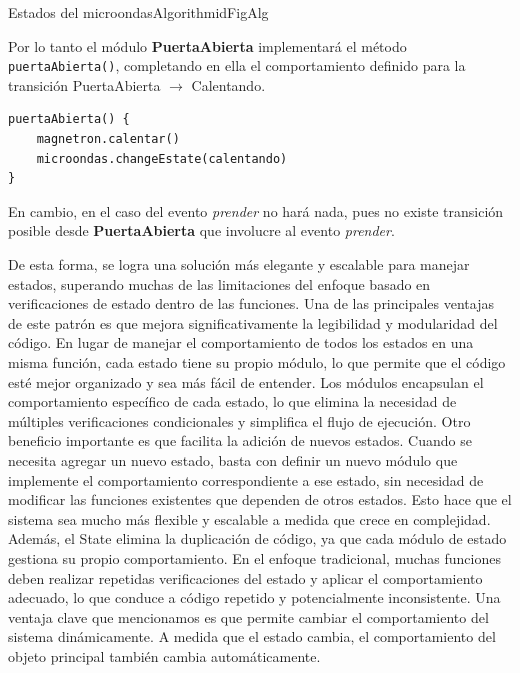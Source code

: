 \begin{pattern}[]{Estados del microondas}{Algorithm}{idFigAlg}
\assigns
{}

\end{pattern}

Por lo tanto el módulo \textbf{PuertaAbierta} implementará el método \verb|puertaAbierta()|, completando en ella el comportamiento definido para la transición PuertaAbierta $\xrightarrow{}$ Calentando.

\begin{lstlisting}[caption=Implementación  puertaAbierta, style=seudocode]
puertaAbierta() {
    magnetron.calentar()
    microondas.changeEstate(calentando)
}
\end{lstlisting}

En cambio, en el caso del evento \textit{prender} no hará nada, pues no existe transición posible desde \textbf{PuertaAbierta} que involucre al evento \textit{prender}.

De esta forma, se logra una solución más elegante y escalable para manejar estados, superando muchas de las limitaciones del enfoque basado en verificaciones de estado dentro de las funciones. Una de las principales ventajas de este patrón es que mejora significativamente la legibilidad y modularidad del código. En lugar de manejar el comportamiento de todos los estados en una misma función, cada estado tiene su propio módulo, lo que permite que el código esté mejor organizado y sea más fácil de entender. Los módulos encapsulan el comportamiento específico de cada estado, lo que elimina la necesidad de múltiples verificaciones condicionales y simplifica el flujo de ejecución. Otro beneficio importante es que facilita la adición de nuevos estados. Cuando se necesita agregar un nuevo estado, basta con definir un nuevo módulo que implemente el comportamiento correspondiente a ese estado, sin necesidad de modificar las funciones existentes que dependen de otros estados. Esto hace que el sistema sea mucho más flexible y escalable a medida que crece en complejidad. Además, el State elimina la duplicación de código, ya que cada módulo de estado gestiona su propio comportamiento. En el enfoque tradicional, muchas funciones deben realizar repetidas verificaciones del estado y aplicar el comportamiento adecuado, lo que conduce a código repetido y potencialmente inconsistente. Una ventaja clave que mencionamos es que permite cambiar el comportamiento del sistema dinámicamente. A medida que el estado cambia, el comportamiento del objeto principal también cambia automáticamente. 


